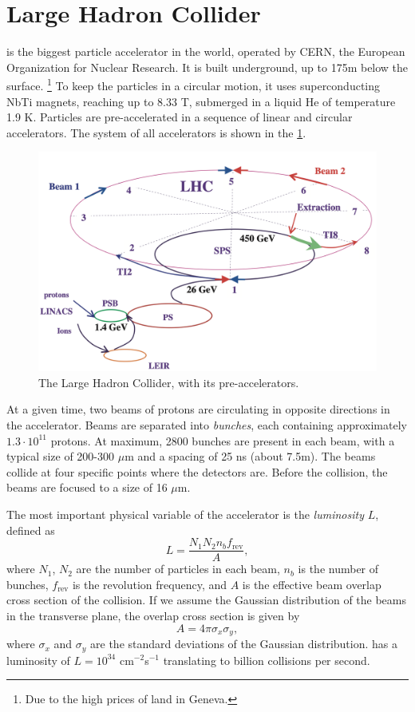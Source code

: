 \section{Large Hadron Collider}
\label{sec:lhc}
\LHC is the biggest particle accelerator in the world, operated by CERN, the European Organization for Nuclear Research.
It is built underground, up to 175m below the surface. \footnote{Due to the high prices of land in Geneva.}
To keep the particles in a circular motion, it uses superconducting NbTi magnets, reaching up to 8.33 T, submerged in a liquid He of temperature 1.9 K.
Particles are pre-accelerated in a sequence of linear and circular accelerators.
The system of all accelerators is shown in the \cref{fig:lhc}.
\begin{figure}[htb]
    \centering
    \includegraphics[width=0.9\linewidth]{src/img/LHC.png}
    \caption{The Large Hadron Collider, with its pre-accelerators.}
    \label{fig:lhc}
\end{figure}


At a given time, two beams of protons are circulating in opposite directions in the accelerator.
Beams are separated into \emph{bunches}, each containing approximately $1.3\cdot10^{11}$ protons.
At maximum, 2800 bunches are present in each beam, with a typical size of 200-300 $\mu$m and a spacing of 25 ns (about 7.5m).
The beams collide at four specific points where the detectors are.
Before the collision, the beams are focused to a size of 16 $\mu$m.

The most important physical variable of the accelerator is the \emph{luminosity} $L$, defined as 
\begin{equation}
    \label{eq:lumni}
    L = \frac{N_1 N_2 n_b f_{\text{rev}}}{A}, 
\end{equation}
where $N_1$, $N_2$ are the number of particles in each beam, $n_b$ is the number of bunches, $f_{\text{rev}}$ is the revolution frequency, and $A$ is the effective beam overlap cross section of the collision. 
If we assume the Gaussian distribution of the beams in the transverse plane, the overlap cross section is given by 
\begin{equation}
    A = 4 \pi \sigma_x \sigma_y,
\end{equation}
where $\sigma_x$ and $\sigma_y$ are the standard deviations of the Gaussian distribution.
\LHC has a luminosity of $L = 10^{34}$ cm$^{-2}$s$^{-1}$ translating to billion collisions per second.

